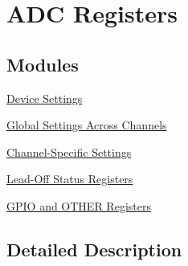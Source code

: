 \hypertarget{group___a_d_c_reg}{\section{A\-D\-C Registers}
\label{group___a_d_c_reg}
}
\subsection*{Modules}
\begin{DoxyCompactItemize}
\item 
\hyperlink{group___dev_set}{Device Settings}
\item 
\hyperlink{group___gbl_set}{Global Settings Across Channels}
\item 
\hyperlink{group___chn_set}{Channel-\/\-Specific Settings}
\item 
\hyperlink{group___l_o_f_f_stat_reg}{Lead-\/\-Off Status Registers}
\item 
\hyperlink{group___g_p_i_o___oth}{G\-P\-I\-O and O\-T\-H\-E\-R Registers}
\end{DoxyCompactItemize}


\subsection{Detailed Description}
